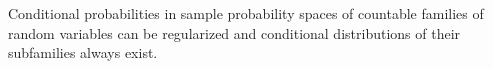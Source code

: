Conditional probabilities in sample probability spaces of countable families of random variables can be regularized and conditional distributions of their subfamilies always exist.
